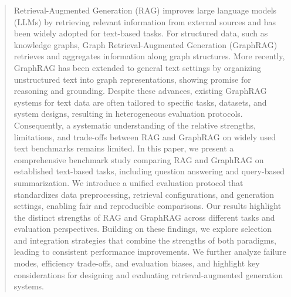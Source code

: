 \begin{abstract}
Retrieval-Augmented Generation (RAG) improves large language models (LLMs) by retrieving relevant information from external sources and has been widely adopted for text-based tasks. For structured data, such as knowledge graphs, Graph Retrieval-Augmented Generation (GraphRAG) retrieves and aggregates information along graph structures. More recently, GraphRAG has been extended to general text settings by organizing unstructured text into graph representations, showing promise for reasoning and grounding.
Despite these advances, existing GraphRAG systems for text data are often tailored to specific tasks, datasets, and system designs, resulting in heterogeneous evaluation protocols. Consequently, a systematic understanding of the relative strengths, limitations, and trade-offs between RAG and GraphRAG on widely used text benchmarks remains limited.
In this paper, we present a comprehensive benchmark study comparing RAG and GraphRAG on established text-based tasks, including question answering and query-based summarization. We introduce a unified evaluation protocol that standardizes data preprocessing, retrieval configurations, and generation settings, enabling fair and reproducible comparisons. Our results highlight the distinct strengths of RAG and GraphRAG across different tasks and evaluation perspectives. 
Building on these findings, we explore selection and integration strategies that combine the strengths of both paradigms, leading to consistent performance improvements. We further analyze failure modes, efficiency trade-offs, and evaluation biases, and highlight key considerations for designing and evaluating retrieval-augmented generation systems.


\end{abstract}



